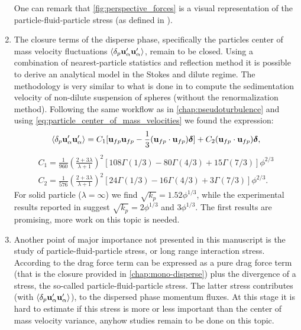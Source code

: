 \begin{enumerate}
    One can remark that \ref{fig:perspective_forces} is a visual representation of the particle-fluid-particle stress (as defined in \citep{zhang2021ensemble}). 
    \item The closure terms of the disperse phase, specifically the particles center of mass velocity fluctuations $\left<\delta_p \textbf{u}_\alpha'\textbf{u}_\alpha'\right>$, remain to be closed. 
    Using a combination of nearest-particle statistics and reflection method it is possible to derive an analytical model in the Stokes and dilute regime. 
    The methodology is very similar to what is done in \citet{zhang2021ensemble} to compute the sedimentation velocity of non-dilute suspension of spheres (without the renormalization method). 
    Following the same workflow as in \ref{chap:pseudoturbulence} and using \ref{eq:particle_center_of_mass_velocities} we found the expression: 
    \begin{equation*}
        \left<\delta_p \textbf{u}_\alpha'\textbf{u}_\alpha'\right>
        = 
        C_1[\textbf{u}_{fp}\textbf{u}_{fp} - \frac{1}{3}(\textbf{u}_{fp}\cdot \textbf{u}_{fp})\bm\delta] 
        + C_2(\textbf{u}_{fp}\cdot \textbf{u}_{fp})\bm\delta,
    \end{equation*}
    \begin{align}
      C_1 = \frac{1}{960}\left(\frac{2+3\lambda}{\lambda+1}\right)^2 \left[
        108\Gamma(1/3)
        - 80\Gamma (4/3)
        +15\Gamma(7/3)
      \right]\phi^{2/3}\\
      C_2 = \frac{1}{576}\left(
        \frac{2+3\lambda}{\lambda+1}\right)^2 \left[
        24\Gamma(1/3)
        - 16\Gamma (4/3)
        +3\Gamma(7/3)
      \right]\phi^{2/3}.
    \end{align}
    For solid particle ($\lambda=\infty$) we find $\sqrt{k_p} = 1.52\phi^{1/3}$, while the experimental results reported in \citet{guazzelli2011fluctuations} suggest $\sqrt{k_p} = 2\phi^{1/3}$ and $3\phi^{1/3}$. 
    The first results are promising, more work on this topic is needed.
    \item Another point of major importance not presented in this manuscript is the study of particle-fluid-particle stress, or long range interaction stress. 
    According to \cite{Lhuillier_2009,nott2011suspension,zhang2021ensemble} the drag force term can be expressed as a pure drag force term (that is the closure provided in \ref{chap:mono-disperse}) plus the divergence of a stress, the so-called particle-fluid-particle stress. 
    The latter stress contributes (with $\left<\delta_p \textbf{u}_\alpha'\textbf{u}_\alpha'\right>$), to the dispersed phase momentum fluxes.  
    At this stage it is hard to estimate if this stress is more or less important than the center of mass velocity variance, anyhow studies remain to be done on this topic. 
\end{enumerate}

